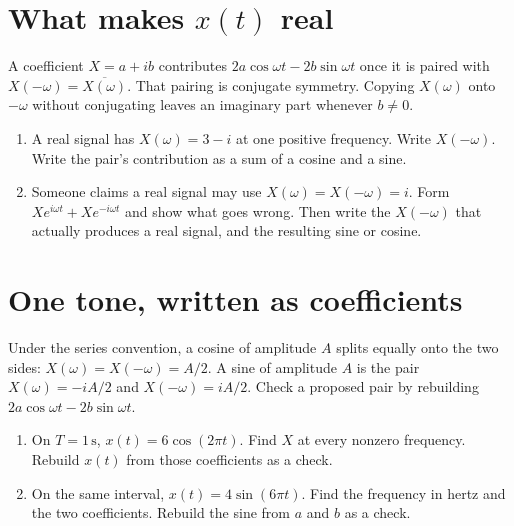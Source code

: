 \documentclass[11pt,letterpaper]{article}
\begin{document}
\section{What makes $x(t)$ real}

\begin{idea}
A coefficient $X = a + ib$ contributes $2a\cos\omega t - 2b\sin\omega t$ once it is paired with $X(-\omega) = \overline{X(\omega)}$. That pairing is conjugate symmetry. Copying $X(\omega)$ onto $-\omega$ without conjugating leaves an imaginary part whenever $b \ne 0$.
\end{idea}

\begin{enumerate}
\item A real signal has $X(\omega) = 3 - i$ at one positive frequency. Write $X(-\omega)$. Write the pair's contribution as a sum of a cosine and a sine.
\item Someone claims a real signal may use $X(\omega) = X(-\omega) = i$. Form $X e^{i\omega t} + X e^{-i\omega t}$ and show what goes wrong. Then write the $X(-\omega)$ that actually produces a real signal, and the resulting sine or cosine.
\end{enumerate}

\section{One tone, written as coefficients}

\begin{idea}
Under the series convention, a cosine of amplitude $A$ splits equally onto the two sides: $X(\omega) = X(-\omega) = A/2$. A sine of amplitude $A$ is the pair $X(\omega) = -iA/2$ and $X(-\omega) = iA/2$. Check a proposed pair by rebuilding $2a\cos\omega t - 2b\sin\omega t$.
\end{idea}

\begin{enumerate}
\item On $T = 1\,\mathrm{s}$, $x(t) = 6\cos(2\pi t)$. Find $X$ at every nonzero frequency. Rebuild $x(t)$ from those coefficients as a check.
\item On the same interval, $x(t) = 4\sin(6\pi t)$. Find the frequency in hertz and the two coefficients. Rebuild the sine from $a$ and $b$ as a check.
\end{enumerate}
\end{document}
